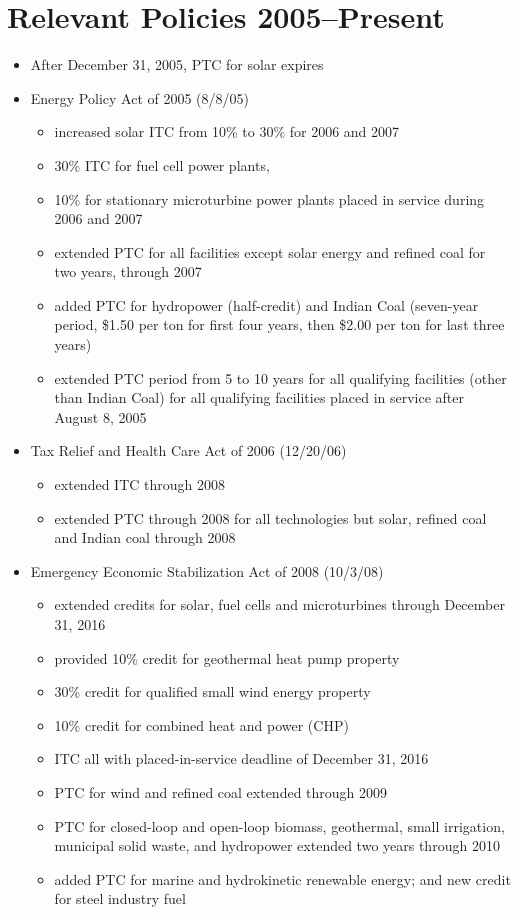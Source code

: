 \documentclass[11pt, oneside]{article}   	%
\begin{document}
\section{Relevant Policies 2005--Present}
\begin{itemize}

\item After December 31, 2005, PTC for solar expires 

\item Energy Policy Act of 2005 (8/8/05)
\begin{itemize}
\item increased solar ITC from 10\% to 30\% for 2006 and 2007
\item 30\% ITC for fuel cell power plants, 
\item 10\% for stationary microturbine power plants placed in service during 2006 and 2007
\item extended PTC for all facilities except solar energy and refined coal for two years, through 2007
\item added PTC for hydropower (half-credit) and Indian Coal (seven-year period, \$1.50 per ton for first four years, then \$2.00 per ton for last three years)
\item extended PTC period from 5 to 10 years for all qualifying facilities (other than Indian Coal) for all qualifying facilities placed in service after August 8, 2005
\end{itemize}

\item Tax Relief and Health Care Act of 2006 (12/20/06)
\begin{itemize}
\item extended ITC through 2008
\item extended PTC through 2008 for all technologies but solar, refined coal and Indian coal through 2008
\end{itemize}

\item Emergency Economic Stabilization Act of 2008 (10/3/08)
\begin{itemize}
\item extended credits for solar, fuel cells and microturbines through December 31, 2016
\item provided 10\% credit for geothermal heat pump property
\item 30\% credit for qualified small wind energy property
\item 10\% credit for combined heat and power (CHP)
\item ITC all with placed-in-service deadline of December 31, 2016
\item PTC for wind and refined coal extended through 2009
\item PTC for closed-loop and open-loop biomass, geothermal, small irrigation, municipal solid waste, and hydropower extended two years through 2010
\item added PTC for marine and hydrokinetic renewable energy; and new credit for steel industry fuel
\end{itemize}


\end{itemize}
\end{document}
